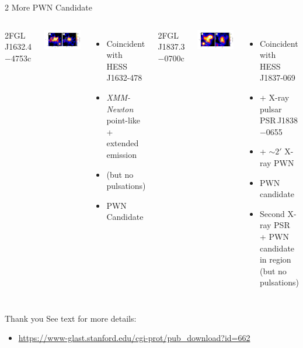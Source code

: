 \documentclass[12pt]{beamer}
\begin{document}
\begin{frame}{2 More PWN Candidate}


  \begin{columns}

2FGL\,J1632.4$-$4753c 

    \includegraphics[scale=0.3]{plots/source_HESS_J1632-478_color.pdf}

    \begin{itemize}
      \item Coincident with HESS\,J1632-478

      \item  {\em XMM-Newton} point-like + extended emission
      \item (but no pulsations)
      \item PWN Candidate
    \end{itemize}


    2FGL\,J1837.3$-$0700c 

    \includegraphics[scale=0.3]{plots/source_HESS_J1837-069_color.pdf}

    \begin{itemize}
      \item Coincident with HESS\,J1837-069
      \item + X-ray pulsar PSR\,J1838$-$0655 
      \item + $\sim 2'$ X-ray PWN 
      \item PWN candidate
      \item Second X-ray PSR + PWN candidate in region
        (but no pulsations)
    \end{itemize}
  \end{columns}
\end{frame}


\begin{frame}{Thank you}
  See text for more details:
  \begin{itemize}
    \item
  \url{https://www-glast.stanford.edu/cgi-prot/pub_download?id=662}
  \end{itemize}

\end{frame}
\end{document}
